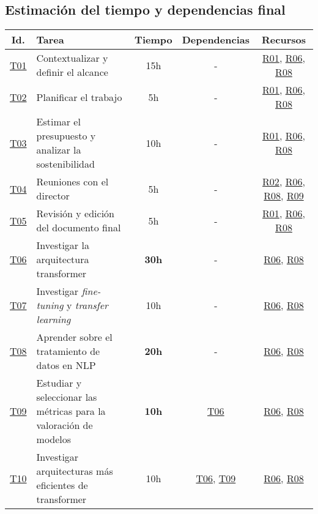 \begin{landscape}
    \begin{table}
    \section{Estimación del tiempo y dependencias final}\label{estimaciontemporalfin}
    \centering
    \begin{tabular}{ | c | l | c | c | c | }
        \hline
        Id. & Tarea & Tiempo & Dependencias & Recursos \\
        \hline
        \hyperref[T01]{T01} & Contextualizar y definir el alcance & 15h & - & \hyperref[R01]{R01}, \hyperref[R06]{R06}, \hyperref[R08]{R08} \\
        \hline
        \hyperref[T02]{T02} & Planificar el trabajo & 5h & - & \hyperref[R01]{R01}, \hyperref[R06]{R06}, \hyperref[R08]{R08} \\
        \hline
        \hyperref[T03]{T03} & Estimar el presupuesto y analizar la sostenibilidad & 10h & - & \hyperref[R01]{R01}, \hyperref[R06]{R06}, \hyperref[R08]{R08} \\
        \hline
        \hyperref[T04]{T04} & Reuniones con el director & 5h & - & \hyperref[R02]{R02}, \hyperref[R06]{R06}, \hyperref[R08]{R08}, \hyperref[R09]{R09} \\
        \hline
        \hyperref[T05]{T05} & Revisión y edición del documento final & 5h & - & \hyperref[R01]{R01}, \hyperref[R06]{R06}, \hyperref[R08]{R08} \\
        \hline
        \hyperref[T06]{T06} & Investigar la arquitectura transformer & \textbf{30h} & - & \hyperref[R06]{R06}, \hyperref[R08]{R08} \\
        \hline
        \hyperref[T07]{T07} & Investigar \textit{fine-tuning} y \textit{transfer learning} & 10h & - & \hyperref[R06]{R06}, \hyperref[R08]{R08} \\
        \hline
        \hyperref[T08]{T08} & Aprender sobre el tratamiento de datos en NLP & \textbf{20h} & - & \hyperref[R06]{R06}, \hyperref[R08]{R08} \\
        \hline
        \hyperref[T09]{T09} & Estudiar y seleccionar las métricas para la valoración de
        modelos & \textbf{10h} & \hyperref[T06]{T06} & \hyperref[R06]{R06}, \hyperref[R08]{R08} \\
        \hline
        \hyperref[T10]{T10} & Investigar arquitecturas más eficientes de transformer & 10h & \hyperref[T06]{T06}, \hyperref[T09]{T09} & \hyperref[R06]{R06}, \hyperref[R08]{R08} \\

\end{tabular}
\end{table}
\end{landscape}
